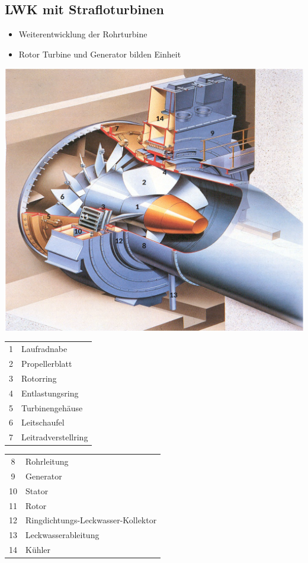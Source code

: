 \newcolumn
\subsection{LWK mit Strafloturbinen}

\begin{itemize}
    \item Weiterentwicklung der Rohrturbine
    \item Rotor Turbine und Generator bilden Einheit
\end{itemize}

\begin{center}
    \includegraphics[width=0.95\columnwidth, align=c]{images/Laufwasserkraftwerke_mit_Strafloturbinen.png}
\end{center}

\begin{minipage}[t]{0.38\columnwidth}
    \begin{tabular}{c l}
        1 & Laufradnabe \\
        2 & Propellerblatt \\
        3 & Rotorring \\
        4 & Entlastungsring \\
        5 & Turbinengehäuse \\
        6 & Leitschaufel \\
        7 & Leitradverstellring \\
    \end{tabular}
\end{minipage}
\hfill
\begin{minipage}[t]{0.58\columnwidth}
    \begin{tabular}{c l}
        8 & Rohrleitung \\
        9 & Generator \\
        10 & Stator \\
        11 & Rotor \\
        12 & Ringdichtungs-Leckwasser-Kollektor \\
        13 & Leckwasserableitung \\
        14 & Kühler \\
    \end{tabular}
\end{minipage}

